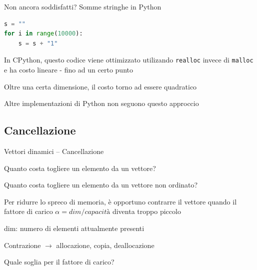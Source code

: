 \begin{frame}[fragile]{Non ancora soddisfatti? Somme stringhe in Python}

\vspace{-9pt}
\begin{myboxtitle}[Esempio]
\vspace{-9pt}
\begin{lstlisting}[language=python]
s = ""
for i in range(10000):
    s = s + "1"
\end{lstlisting}
\vspace{-9pt}
\end{myboxtitle}

\bigskip
\BIL
\item In CPython, questo codice viene ottimizzato utilizando \texttt{realloc} invece di \texttt{malloc} e ha costo lineare - fino ad un certo punto
\item Oltre una certa dimensione, il costo torno ad essere quadratico
\item Altre implementazioni di Python non seguono questo approccio
\EIL


\end{frame}



\subsection{Cancellazione}

\begin{frame}{Vettori dinamici -- Cancellazione}

\begin{myboxtitle}[Domande]
\BI
\item Quanto costa togliere un elemento da un vettore?
\item Quanto costa togliere un elemento da un vettore \alert{non ordinato}?
\EI
\end{myboxtitle}

\begin{myboxtitle}[Contrazione]
Per ridurre lo spreco di memoria, è opportuno contrarre il vettore quando il \alert{fattore di carico $\alpha = \textit{dim} / \textit{capacità}$} diventa troppo piccolo

\BI
\item \alert{dim}: numero di elementi attualmente presenti
\item Contrazione $\rightarrow$ allocazione, copia, deallocazione
\EI
\end{myboxtitle}

\begin{myboxtitle}[Domanda]
Quale soglia per il fattore di carico?
\end{myboxtitle}

\end{frame}

